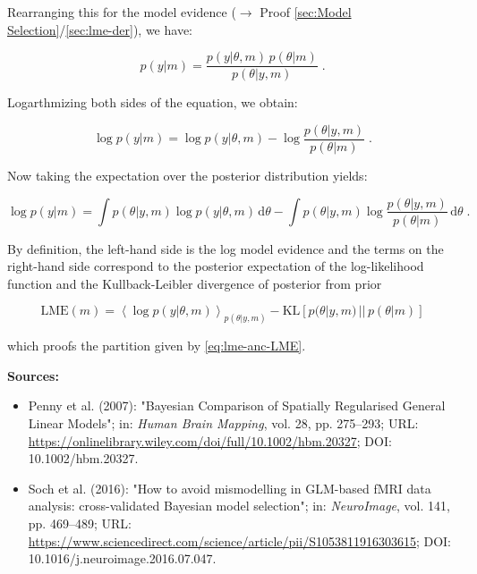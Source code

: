 \documentclass[a4paper,12pt,twoside]{book}
\begin{document}
Rearranging this for the model evidence ($\rightarrow$ Proof \ref{sec:Model Selection}/\ref{sec:lme-der}), we have:

\begin{equation} \label{eq:lme-anc-AnC-s2}
p(y|m) = \frac{p(y|\theta,m) \, p(\theta|m)}{p(\theta|y,m)} \; .
\end{equation}

Logarthmizing both sides of the equation, we obtain:

\begin{equation} \label{eq:lme-anc-AnC-s3}
\log p(y|m) = \log p(y|\theta,m) - \log \frac{p(\theta|y,m)}{p(\theta|m)} \; .
\end{equation}

Now taking the expectation over the posterior distribution yields:

\begin{equation} \label{eq:lme-anc-AnC-s4}
\log p(y|m) = \int p(\theta|y,m) \log p(y|\theta,m) \, \mathrm{d}\theta - \int p(\theta|y,m) \log \frac{p(\theta|y,m)}{p(\theta|m)} \, \mathrm{d}\theta \; .
\end{equation}

By definition, the left-hand side is the log model evidence and the terms on the right-hand side correspond to the posterior expectation of the log-likelihood function and the Kullback-Leibler divergence of posterior from prior

\begin{equation} \label{eq:lme-anc-LME-AnC}
\mathrm{LME}(m) = \left\langle \log p(y|\theta,m) \right\rangle_{p(\theta|y,m)} - \mathrm{KL} \left[ p(\theta|y,m) \, || \, p(\theta|m) \right]
\end{equation}

which proofs the partition given by \eqref{eq:lme-anc-LME}.


\vspace{1em}
\textbf{Sources:}
\begin{itemize}
\item Penny et al. (2007): "Bayesian Comparison of Spatially Regularised General Linear Models"; in: \textit{Human Brain Mapping}, vol. 28, pp. 275–293; URL: \url{https://onlinelibrary.wiley.com/doi/full/10.1002/hbm.20327}; DOI: 10.1002/hbm.20327.
\item Soch et al. (2016): "How to avoid mismodelling in GLM-based fMRI data analysis: cross-validated Bayesian model selection"; in: \textit{NeuroImage}, vol. 141, pp. 469–489; URL: \url{https://www.sciencedirect.com/science/article/pii/S1053811916303615}; DOI: 10.1016/j.neuroimage.2016.07.047.
\end{itemize}
\end{document}
